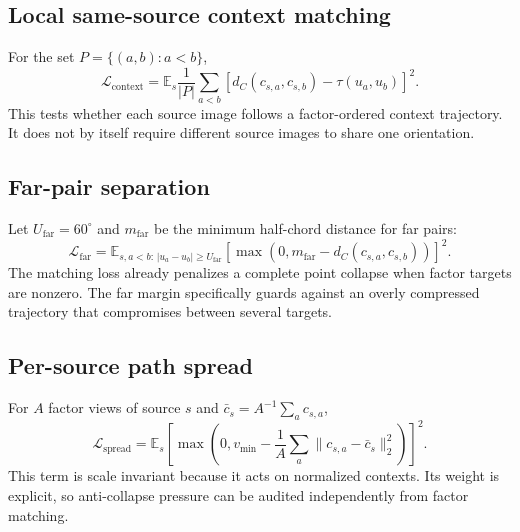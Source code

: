 \documentclass[11pt]{article}
\newcommand{\Lc}{\mathcal{L}_{\mathrm{context}}}
\newcommand{\Lfar}{\mathcal{L}_{\mathrm{far}}}
\newcommand{\Lspread}{\mathcal{L}_{\mathrm{spread}}}
\begin{document}
\subsection{Local same-source context matching}
For the set $P=\{(a,b):a<b\}$,
\begin{equation}
 \Lc=
 \mathbb{E}_{s}
 \frac{1}{|P|}
 \sum_{a<b}
 \left[
 d_C(c_{s,a},c_{s,b})-
 \tau(u_a,u_b)
 \right]^2.
 \label{eq:contextloss}
\end{equation}
This tests whether each source image follows a factor-ordered context trajectory. It does not by itself require different source images to share one orientation.

\subsection{Far-pair separation}
Let $U_{\mathrm{far}}=60^\circ$ and $m_{\mathrm{far}}$ be the minimum half-chord distance for far pairs:
\begin{equation}
 \Lfar=
 \mathbb{E}_{s,a<b:\,|u_a-u_b|\geq U_{\mathrm{far}}}
 \left[
 \max\!\left(0,m_{\mathrm{far}}-d_C(c_{s,a},c_{s,b})\right)
 \right]^2.
 \label{eq:farloss}
\end{equation}
The matching loss already penalizes a complete point collapse when factor targets are nonzero. The far margin specifically guards against an overly compressed trajectory that compromises between several targets.

\subsection{Per-source path spread}
For $A$ factor views of source $s$ and $\bar c_s=A^{-1}\sum_a c_{s,a}$,
\begin{equation}
 \Lspread=
 \mathbb{E}_{s}
 \left[
 \max\!\left(
 0,
 v_{\min}-
 \frac{1}{A}\sum_a
 \lVert c_{s,a}-\bar c_s\rVert_2^2
 \right)
 \right]^2.
 \label{eq:spreadloss}
\end{equation}
This term is scale invariant because it acts on normalized contexts. Its weight is explicit, so anti-collapse pressure can be audited independently from factor matching.
\end{document}
